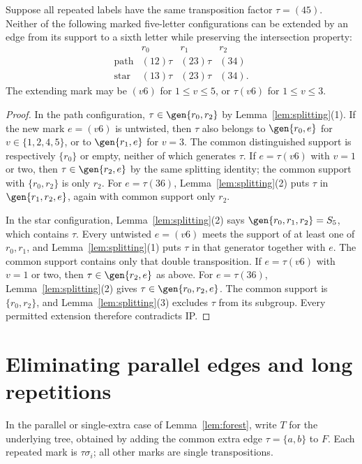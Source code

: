 \begin{lemma}\label{lem:fivecores}
Suppose all repeated labels have the same transposition factor
$\tau=(45)$. Neither of the following marked five-letter configurations
can be extended by an edge from its support to a sixth letter while
preserving the intersection property:
\begin{equation}\label{eq:fivecores}
\begin{array}{c|ccc}
 &r_0&r_1&r_2\\\hline
\mathrm{path}&(12)\tau&(23)\tau&(34)\\
\mathrm{star}&(13)\tau&(23)\tau&(34).
\end{array}                                                    \end{equation}
The extending mark may be $(v6)$ for $1\leq v\leq5$, or
$\tau(v6)$ for $1\leq v\leq3$.
\end{lemma}
\begin{proof}
In the path configuration, $\tau\in\gen{r_0,r_2}$ by
Lemma~\ref{lem:splitting}(1). If the new mark $e=(v6)$ is untwisted,
then $\tau$ also belongs to $\gen{r_0,e}$ for
$v\in\{1,2,4,5\}$, or to $\gen{r_1,e}$ for $v=3$.
The common distinguished support is respectively $\{r_0\}$ or
empty, neither of which generates $\tau$. If $e=\tau(v6)$ with
$v=1$ or two, then $\tau\in\gen{r_2,e}$ by the same splitting
identity; the common support with $\{r_0,r_2\}$ is only $r_2$.
For $e=\tau(36)$, Lemma~\ref{lem:splitting}(2) puts $\tau$ in
$\gen{r_1,r_2,e}$, again with common support only $r_2$.

In the star configuration, Lemma~\ref{lem:splitting}(2) says
$\gen{r_0,r_1,r_2}=S_5$, which contains $\tau$. Every untwisted
$e=(v6)$ meets the support of at least one of $r_0,r_1$, and
Lemma~\ref{lem:splitting}(1) puts $\tau$ in that generator together
with $e$. The common support contains only that double transposition.
If $e=\tau(v6)$ with $v=1$ or two, then
$\tau\in\gen{r_2,e}$ as above. For $e=\tau(36)$,
Lemma~\ref{lem:splitting}(2) gives
$\tau\in\gen{r_0,r_2,e}$. The common support is
$\{r_0,r_2\}$, and Lemma~\ref{lem:splitting}(3) excludes $\tau$
from its subgroup. Every permitted extension therefore contradicts IP.
\end{proof}

\section{Eliminating parallel edges and long repetitions}
In the parallel or single-extra case of Lemma~\ref{lem:forest}, write
$T$ for the underlying tree, obtained by adding the common extra edge
$\tau=\{a,b\}$ to $F$. Each repeated mark is $\tau\sigma_i$;
all other marks are single transpositions.

